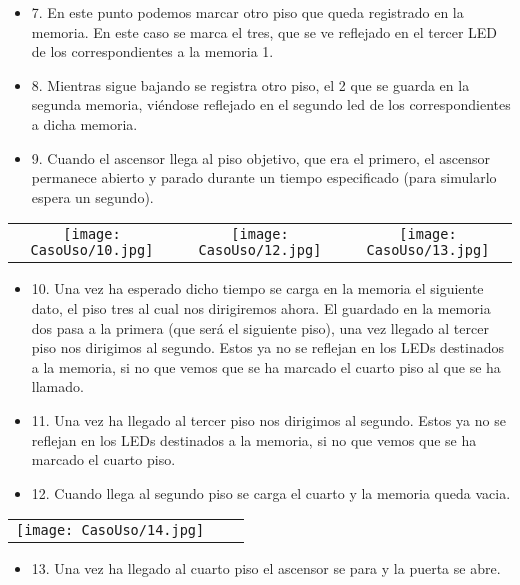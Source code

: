 	\begin{itemize}
	    \item 7. En este punto podemos marcar otro piso que queda registrado en la memoria. En este caso se marca el tres, que se ve reflejado en el tercer LED de los correspondientes a la memoria 1.	
	    \item 8. Mientras sigue bajando se registra otro piso, el 2 que se guarda en la segunda memoria, viéndose reflejado en el segundo led de los correspondientes a dicha memoria.	
	    \item 9. Cuando el ascensor llega al piso objetivo, que era el primero, el ascensor permanece abierto y parado durante un tiempo especificado (para simularlo espera un segundo).
	\end{itemize}
	
	\begin{table}[H]
	\centering
	\begin{tabular}{ccc}
		 \texttt{[image: CasoUso/10.jpg]}  &
		 \texttt{[image: CasoUso/12.jpg]}   &
		 \texttt{[image: CasoUso/13.jpg]}  \\ 
	\end{tabular}
	\end{table}
	\begin{itemize}
	    \item 10.  Una vez ha esperado dicho tiempo se carga en la memoria el siguiente dato, el piso tres al cual nos dirigiremos ahora. El guardado en la memoria dos pasa a la primera (que será el siguiente piso), una vez llegado al tercer piso nos dirigimos al segundo. Estos ya no se reflejan en los LEDs destinados a la memoria, si no que vemos que se ha marcado el cuarto piso al que se ha llamado.
	    \item 11.  Una vez ha llegado al tercer piso nos dirigimos al segundo. Estos ya no se reflejan en los LEDs destinados a la memoria, si no que vemos que se ha marcado el cuarto piso.
	    \item 12. Cuando llega al segundo piso se carga el cuarto y la memoria queda vacia.
	\end{itemize}
	
	\begin{table}[H]
	\centering
	\begin{tabular}{ccc}
		 \texttt{[image: CasoUso/14.jpg]}   &  &  \\
	\end{tabular}
	\end{table}
	
	\begin{itemize}
	    \item 13. Una vez ha llegado al cuarto piso el ascensor se para y la puerta se abre.
	\end{itemize}